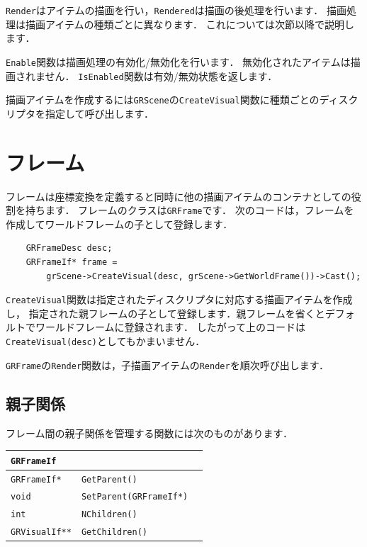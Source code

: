 \texttt{Render}\KLUDGE はアイテムの描画を行い，\texttt{Rendered}\KLUDGE は描画の後処理を行います．
\KLUDGE 描画処理は描画アイテムの種類ごとに異なります．
\KLUDGE これについては次節以降で説明します．

\texttt{Enable}\KLUDGE 関数は描画処理の有効化/\KLUDGE 無効化を行います．
\KLUDGE 無効化されたアイテムは描画されません．
\texttt{IsEnabled}\KLUDGE 関数は有効/\KLUDGE 無効状態を返します．

\KLUDGE 描画アイテムを作成するには\texttt{GRScene}\KLUDGE の\texttt{CreateVisual}\KLUDGE 関数に種類ごとのディスクリプタを指定して呼び出します．


\section{\KLUDGE フレーム}

\KLUDGE フレームは座標変換を定義すると同時に他の描画アイテムのコンテナとしての役割を持ちます．
\KLUDGE フレームのクラスは\texttt{GRFrame}\KLUDGE です．
\KLUDGE 次のコードは，フレームを作成してワールドフレームの子として登録します．
\begin{verbatim}
    GRFrameDesc desc;
    GRFrameIf* frame =
        grScene->CreateVisual(desc, grScene->GetWorldFrame())->Cast();
\end{verbatim}
\texttt{CreateVisual}\KLUDGE 関数は指定されたディスクリプタに対応する描画アイテムを作成し，
\KLUDGE 指定された親フレームの子として登録します．親フレームを省くとデフォルトでワールドフレームに登録されます．
\KLUDGE したがって上のコードは\texttt{CreateVisual(desc)}\KLUDGE としてもかまいません．

\texttt{GRFrame}\KLUDGE の\texttt{Render}\KLUDGE 関数は，子描画アイテムの\texttt{Render}\KLUDGE を順次呼び出します．


\subsection*{\KLUDGE 親子関係}

\KLUDGE フレーム間の親子関係を管理する関数には次のものがあります．

\begin{center}
\begin{tabular}{p{.20\hsize}p{.45\hsize}p{.25\hsize}}
\multicolumn{3}{l}{\texttt{GRFrameIf}}						\\ \midrule
\texttt{GRFrameIf*}		& \texttt{GetParent()}				& 	\\
\texttt{void} 			& \texttt{SetParent(GRFrameIf*)}	& 	\\
\texttt{int} 			& \texttt{NChildren()}				& 	\\
\texttt{GRVisualIf**} 	& \texttt{GetChildren()}			& 	\\
\end{tabular}
\end{center}


